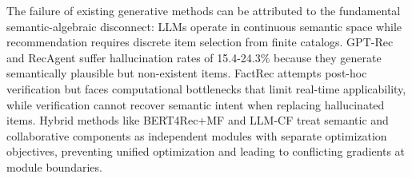\documentclass[acmsmall]{acmart}
\begin{document}
\begin{table}[h]
\centering
\caption{Cross-dataset performance comparison}
\label{tab:rq1_results}
\end{table}

The failure of existing generative methods can be attributed to the fundamental semantic-algebraic disconnect: LLMs operate in continuous semantic space while recommendation requires discrete item selection from finite catalogs. GPT-Rec and RecAgent suffer hallucination rates of 15.4-24.3\% because they generate semantically plausible but non-existent items. FactRec attempts post-hoc verification but faces computational bottlenecks that limit real-time applicability, while verification cannot recover semantic intent when replacing hallucinated items. Hybrid methods like BERT4Rec+MF and LLM-CF treat semantic and collaborative components as independent modules with separate optimization objectives, preventing unified optimization and leading to conflicting gradients at module boundaries.
\end{document}
